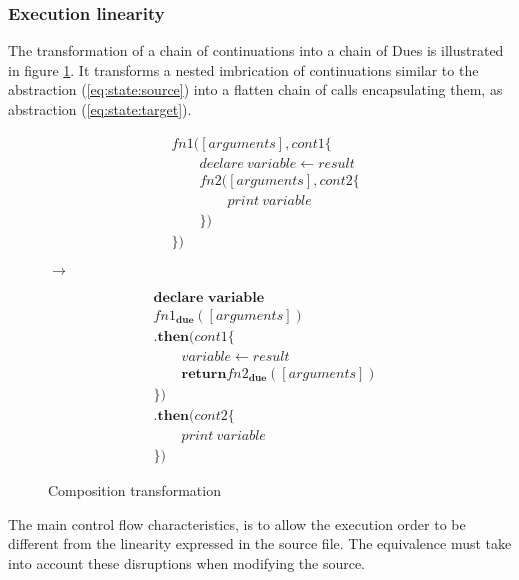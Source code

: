 \subsubsection{Execution linearity}

The transformation of a chain of continuations into a chain of Dues is illustrated in figure \ref{fig:comp-transform}.
It transforms a nested imbrication of continuations similar to the abstraction (\ref{eq:state:source}) into a flatten chain of calls encapsulating them, as abstraction (\ref{eq:state:target}).

\begin{figure}[h!]
  \begin{minipage}{0.40\textwidth}
    \centering
    \begin{align} \label{eq:state:source}
    &fn1([arguments], cont1 \{\nonumber\\
    &\qquad  declare ~ variable \leftarrow result\nonumber\\
    &\qquad  fn2([arguments], cont2 \{\nonumber\\
    &\qquad\qquad    print ~ variable\nonumber\\
    &\qquad  \})\nonumber\\
    &\})
    \end{align}
  \end{minipage}
  \hfill
  $\to$
  \hfill
  \begin{minipage}{0.40\textwidth}
    \centering
    \begin{align} \label{eq:state:target}
    &\textbf{declare variable}\nonumber\\
    &fn1_\textbf{due}([arguments])\nonumber\\
    &\textbf{.then}(cont1\{\nonumber\\
    &\qquad  variable \leftarrow result\nonumber\\
    &\qquad  \textbf{return} fn2_\textbf{due}([arguments])\nonumber\\
    &\})\nonumber\\
    &\textbf{.then}(cont2\{\nonumber\\
    &\qquad  print ~ variable\nonumber\\
    &\})
    \end{align}
  \end{minipage}
  \caption{Composition transformation}
  \label{fig:comp-transform}
\end{figure}

The main control flow characteristics, is to allow the execution order to be different from the linearity expressed in the source file.
The equivalence must take into account these disruptions when modifying the source.

